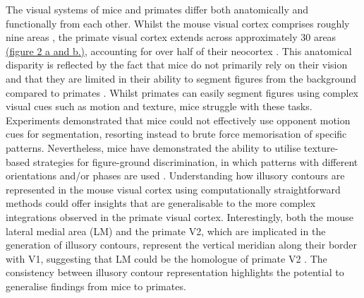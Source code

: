 \documentclass[12pt]{article}
\begin{document}
\bigbreak
The visual systems of mice and primates differ both anatomically and functionally from each other. Whilst the mouse visual cortex comprises roughly nine areas \autocite{wangAreaMapMouse2007}, the primate visual cortex extends across approximately 30 areas \hyperref[fig:Laminar_Figure]{(figure 2 a and b.)}, accounting for over half of their neocortex \autocite{fellemanDistributedHierarchicalProcessing1991}. This anatomical disparity is reflected by the fact that mice do not primarily rely on their vision and that they are limited in their ability to segment figures from the background compared to primates \autocite{luongoMicePrimatesUse2023}. Whilst primates can easily segment figures using complex visual cues such as motion and texture, mice struggle with these tasks. Experiments demonstrated that mice could not effectively use opponent motion cues for segmentation, resorting instead to brute force memorisation of specific patterns. Nevertheless, mice have demonstrated the ability to utilise texture-based strategies for figure-ground discrimination, in which patterns with different orientations and/or phases are used \autocite{kirchbergerEssentialRoleFeedback2020}. Understanding how illusory contours are represented in the mouse visual cortex using computationally straightforward methods could offer insights that are generalisable to the more complex integrations observed in the primate visual cortex. Interestingly, both the mouse lateral medial area (LM) and the primate V2, which are implicated in the generation of illusory contours, represent the vertical meridian along their border with V1, suggesting that LM could be the homologue of primate V2 \autocite{gamanutAnatomicalFunctionalConnectomes2022}. The consistency between illusory contour representation highlights the potential to generalise findings from mice to primates.
\bigbreak
\end{document}
